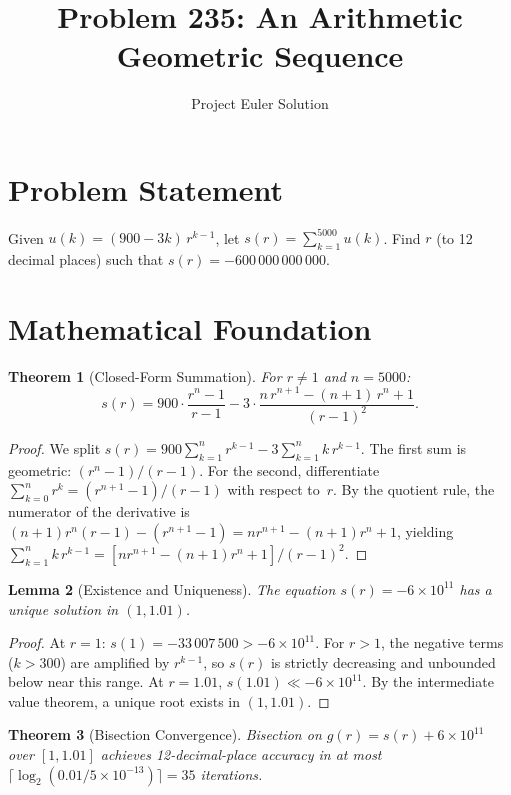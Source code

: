 \documentclass[12pt]{article}
\title{Problem 235: An Arithmetic Geometric Sequence}
\author{Project Euler Solution}
\date{}
\newtheorem{theorem}{Theorem}
\newtheorem{lemma}[theorem]{Lemma}
\begin{document}
\maketitle

\section{Problem Statement}
Given $u(k) = (900 - 3k)\,r^{k-1}$, let $s(r) = \sum_{k=1}^{5000} u(k)$. Find $r$ (to 12 decimal places) such that $s(r) = -600\,000\,000\,000$.

\section{Mathematical Foundation}

\begin{theorem}[Closed-Form Summation]
For $r \neq 1$ and $n = 5000$:
\[
s(r) = 900 \cdot \frac{r^n - 1}{r - 1} - 3 \cdot \frac{n\,r^{n+1} - (n+1)\,r^n + 1}{(r-1)^2}.
\]
\end{theorem}

\begin{proof}
We split $s(r) = 900\sum_{k=1}^{n} r^{k-1} - 3\sum_{k=1}^{n} k\,r^{k-1}$. The first sum is geometric: $(r^n - 1)/(r-1)$. For the second, differentiate $\sum_{k=0}^{n} r^k = (r^{n+1}-1)/(r-1)$ with respect to~$r$. By the quotient rule, the numerator of the derivative is $(n{+}1)r^n(r{-}1) - (r^{n+1}{-}1) = nr^{n+1} - (n{+}1)r^n + 1$, yielding $\sum_{k=1}^{n} k\,r^{k-1} = [nr^{n+1} - (n{+}1)r^n + 1]/(r-1)^2$.
\end{proof}

\begin{lemma}[Existence and Uniqueness]
The equation $s(r) = -6 \times 10^{11}$ has a unique solution in $(1, 1.01)$.
\end{lemma}

\begin{proof}
At $r = 1$: $s(1) = -33\,007\,500 > -6\times 10^{11}$. For $r > 1$, the negative terms ($k > 300$) are amplified by $r^{k-1}$, so $s(r)$ is strictly decreasing and unbounded below near this range. At $r = 1.01$, $s(1.01) \ll -6\times 10^{11}$. By the intermediate value theorem, a unique root exists in $(1, 1.01)$.
\end{proof}

\begin{theorem}[Bisection Convergence]
Bisection on $g(r) = s(r) + 6\times 10^{11}$ over $[1, 1.01]$ achieves 12-decimal-place accuracy in at most $\lceil\log_2(0.01/5\times 10^{-13})\rceil = 35$ iterations.
\end{theorem}
\end{document}
